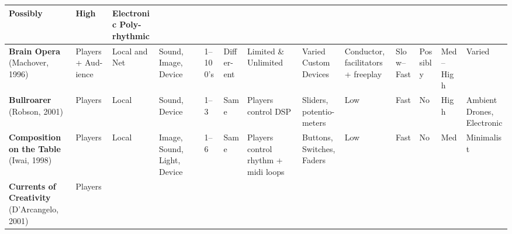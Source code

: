 \begin{center}
\begin{table}[ht]
\begin{tabular}{|p{41pt}|p{22pt}|p{22pt}|p{26pt}|p{17pt}|p{26pt}|p{31pt}|p{35pt}|p{33pt}|p{24pt}|p{35pt}|p{26pt}|p{36pt}|}
{{\small Possibly}
} & \parbox{26pt}{\centering 
{\small High}
} & \parbox{36pt}{\raggedright 
{\small Electronic Poly-rhythmic}
} \\
\hline
\parbox{41pt}{\raggedright 
{\small \textbf{Brain Opera} (Machover, 1996)}
} & \parbox{22pt}{\raggedright 
{\small Players + Aud-ience}
} & \parbox{22pt}{\raggedright 
{\small Local and Net}
} & \parbox{26pt}{\raggedright 
{\small Sound, Image, Device}
} & \parbox{17pt}{\raggedright 
{\small 1--100's}
} & \parbox{26pt}{\raggedright 
{\small Differ-ent}
} & \parbox{31pt}{\centering 
{\small Limited \& Unlimited}
} & \parbox{35pt}{\centering 
{\small Varied Custom Devices}
} & \parbox{33pt}{\centering 
{\small Conductor, facilitators + freeplay}
} & \parbox{24pt}{\centering 
{\small Slow--Fast}
} & \parbox{35pt}{\centering 
{\small Possibly}
} & \parbox{26pt}{\centering 
{\small Med--High}
} & \parbox{36pt}{\raggedright 
{\small Varied}
} \\
\hline
\parbox{41pt}{\raggedright 
{\small \textbf{Bullroarer }(Robson, 2001)}
} & \parbox{22pt}{\raggedright 
{\small Players}
} & \parbox{22pt}{\raggedright 
{\small Local}
} & \parbox{26pt}{\raggedright 
{\small Sound, Device}
} & \parbox{17pt}{\raggedright 
{\small 1--3}
} & \parbox{26pt}{\raggedright 
{\small Same}
} & \parbox{31pt}{\centering 
{\small Players control DSP}
} & \parbox{35pt}{\centering 
{\small Sliders, potentio-meters}
} & \parbox{33pt}{\centering 
{\small Low}
} & \parbox{24pt}{\centering 
{\small Fast}
} & \parbox{35pt}{\centering 
{\small No}
} & \parbox{26pt}{\centering 
{\small High}
} & \parbox{36pt}{\raggedright 
{\small Ambient Drones, Electronic }
} \\
\hline
\parbox{41pt}{\raggedright 
{\small \textbf{Composition on the Table} (Iwai, 1998)}
} & \parbox{22pt}{\raggedright 
{\small Players}
} & \parbox{22pt}{\raggedright 
{\small Local}
} & \parbox{26pt}{\raggedright 
{\small Image, Sound, Light, Device}
} & \parbox{17pt}{\raggedright 
{\small 1--6}
} & \parbox{26pt}{\raggedright 
{\small Same}
} & \parbox{31pt}{\centering 
{\small Players control rhythm + midi loops}
} & \parbox{35pt}{\centering 
{\small Buttons, Switches, Faders}
} & \parbox{33pt}{\centering 
{\small Low}
} & \parbox{24pt}{\centering 
{\small Fast}
} & \parbox{35pt}{\centering 
{\small No}
} & \parbox{26pt}{\centering 
{\small Med}
} & \parbox{36pt}{\raggedright 
{\small Minimalist }
} \\
\hline
\parbox{41pt}{\raggedright 
{\small \textbf{Currents of Creativity} (D'Arcangelo, 2001)}
} & \parbox{22pt}{\raggedright 
{\small Players}
}
\end{tabular}
\end{table}
\end{center}
